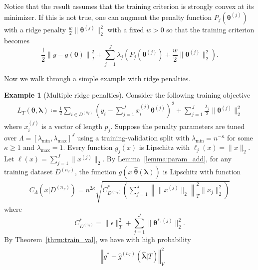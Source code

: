 \documentclass[12pt]{article} %
\theoremstyle{definition}
\newtheorem{example}{Example}
\begin{document}
Notice that the result assumes that the training criterion is strongly convex at its minimizer. If this is not true, one can augment the penalty function $P_j(\boldsymbol{\theta}^{(j)})$ with a ridge penalty $\frac{w}{2}\| \boldsymbol{\theta}^{(j)} \|_2^2$ with a fixed $w > 0$ so that the training criterion becomes
\begin{equation}
\label{eq:param_add_models_ridge}
\frac{1}{2} \left  \| y -  g(\boldsymbol{\theta}) \right \|^2_T 
+ \sum_{j=1}^J \lambda_j \left ( P_j(\boldsymbol{\theta}^{(j)}) + \frac{w}{2} \| \boldsymbol{\theta}^{(j)} \|^2_2 \right ).
\end{equation}

Now we walk through a simple example with ridge penalties.
\begin{example}[Multiple ridge penalties]
	Consider the following training objective
	\begin{align}
	L_T \left (\boldsymbol{\theta}, \boldsymbol{\lambda} \right) 
	\coloneqq 
	\frac{1}{2}
	\sum_{i\in D^{(n_T)}}
	\left(y_i -  \sum_{j=1}^J x_{i}^{(j)} \boldsymbol{\theta}^{(j)} \right )^2
	+ \sum_{j=1}^J \frac{\lambda_j}{2} \|\boldsymbol{\theta}^{(j)}\|_2^2
	\end{align}
	where $x_{i}^{(j)}$ is a vector of length $p_j$.
	Suppose the penalty parameters are tuned over $\Lambda = \left [ \lambda_{\min}, \lambda_{\max} \right ]^J$ using a training-validation split with $\lambda_{\min} = n^{-\kappa}$ for some $\kappa \ge 1$ and $\lambda_{\max} = 1$.
	Every function $g_j(x)$ is Lipschitz with $\ell_j(x) = \|x\|_2$.
	Let $\ell(x) = \sum_{j=1}^J \|x^{(j)}\|_2$.
	By Lemma~\ref{lemma:param_add}, for any training dataset $D^{(n_T)}$, the function $g(x | \hat{\boldsymbol{\theta}}(\boldsymbol{\lambda}))$ is Lipschitz with function
	\begin{align}
	C_\Lambda \left ( x | D^{(n_T)} \right ) =
	n^{2\kappa}
	\sqrt{
		C^*_{D^{(n_T)}}
		\left(
		\sum_{j = 1}^J \left \|\|x^{(j)} \|_2 \right \|_T^2 \|x_j\|_2^2
		\right)
	}
	\end{align}
	where $$
	C^*_{D^{(n_T)}} = 
	\|\epsilon\|_{T}^{2}
	+ \sum_{j=1}^J \|\boldsymbol{\theta}^{*,(j)}\|_2^2
	.$$
	By Theorem~\ref{thrm:train_val}, we have with high probability
	\begin{align}
	\begin{split}
	& \left\Vert g^* - \hat{g}^{(n_T)}( \hat{\boldsymbol{\lambda}} | T) \right\Vert _{V}^2 \\

\end{split}
\end{align}
\end{example}
\end{document}

